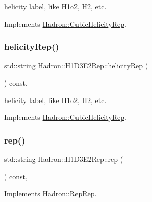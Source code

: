 helicity label, like H1o2, H2, etc. 

Implements \mbox{\hyperlink{structHadron_1_1CubicHelicityRep_af1096946b7470edf0a55451cc662f231}{Hadron\+::\+Cubic\+Helicity\+Rep}}.

\mbox{\label{structHadron_1_1H1D3E2Rep_a9b18f2d67ec482a4a8d2adc6287a1571}} 
\subsubsection{\texorpdfstring{helicityRep()}{helicityRep()}\hspace{0.1cm}{\footnotesize\ttfamily [2/2]}}
{\footnotesize\ttfamily std\+::string Hadron\+::\+H1\+D3\+E2\+Rep\+::helicity\+Rep (\begin{DoxyParamCaption}{ }\end{DoxyParamCaption}) const\hspace{0.3cm}{\ttfamily [inline]}, {\ttfamily [virtual]}}

helicity label, like H1o2, H2, etc. 

Implements \mbox{\hyperlink{structHadron_1_1CubicHelicityRep_af1096946b7470edf0a55451cc662f231}{Hadron\+::\+Cubic\+Helicity\+Rep}}.

\mbox{\label{structHadron_1_1H1D3E2Rep_ace031c7809b792a43f41c55b6b45c355}} 
\subsubsection{\texorpdfstring{rep()}{rep()}\hspace{0.1cm}{\footnotesize\ttfamily [1/3]}}
{\footnotesize\ttfamily std\+::string Hadron\+::\+H1\+D3\+E2\+Rep\+::rep (\begin{DoxyParamCaption}{ }\end{DoxyParamCaption}) const\hspace{0.3cm}{\ttfamily [inline]}, {\ttfamily [virtual]}}



Implements \mbox{\hyperlink{structHadron_1_1RepRep_ab3213025f6de249f7095892109575fde}{Hadron\+::\+Rep\+Rep}}.

\mbox{\label{structHadron_1_1H1D3E2Rep_ace031c7809b792a43f41c55b6b45c355}} 
